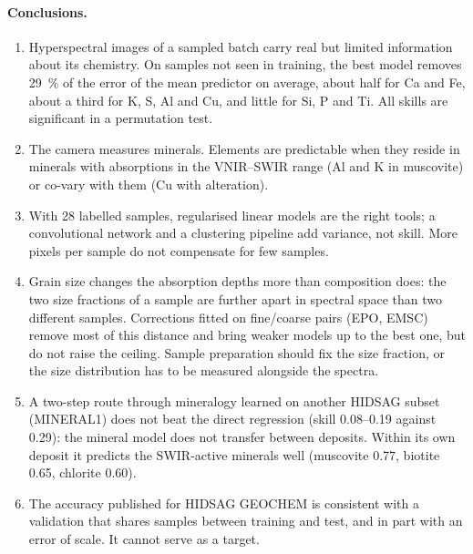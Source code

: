 \documentclass[11pt,a4paper]{article}
\begin{document}
\paragraph{Conclusions.}
\begin{enumerate}
  \item Hyperspectral images of a sampled batch carry real but limited information about its chemistry. On samples
    not seen in training, the best model removes \SI{29}{\percent} of the error of the mean predictor on average,
    about half for Ca and Fe, about a third for K, S, Al and Cu, and little for Si, P and Ti. All skills are
    significant in a permutation test.
  \item The camera measures minerals. Elements are predictable when they reside in minerals with absorptions in
    the VNIR--SWIR range (Al and K in muscovite) or co-vary with them (Cu with alteration).
  \item With 28 labelled samples, regularised linear models are the right tools; a convolutional network and a
    clustering pipeline add variance, not skill. More pixels per sample do not compensate for few samples.
  \item Grain size changes the absorption depths more than composition does: the two size fractions of a sample
    are further apart in spectral space than two different samples. Corrections fitted on fine/coarse pairs (EPO,
    EMSC) remove most of this distance and bring weaker models up to the best one, but do not raise the ceiling.
    Sample preparation should fix the size fraction, or the size distribution has to be measured alongside the
    spectra.
  \item A two-step route through mineralogy learned on another HIDSAG subset (MINERAL1) does not beat the direct
    regression (skill 0.08--0.19 against 0.29): the mineral model does not transfer between deposits. Within its
    own deposit it predicts the SWIR-active minerals well (muscovite 0.77, biotite 0.65, chlorite 0.60).
  \item The accuracy published for HIDSAG GEOCHEM is consistent with a validation that shares samples between
    training and test, and in part with an error of scale. It cannot serve as a target.
\end{enumerate}
\end{document}
